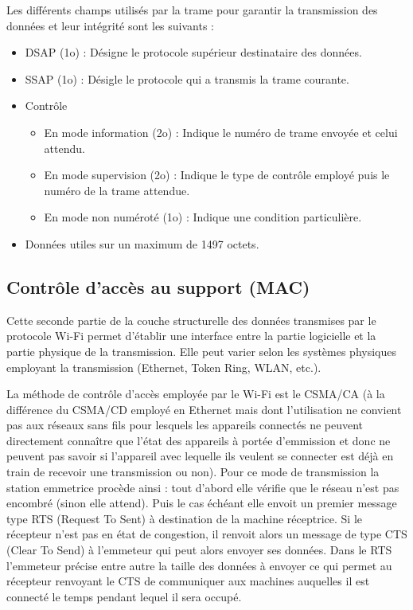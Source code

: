 \documentclass[12pt]{article}
\begin{document}
Les différents champs utilisés par la trame pour garantir la transmission des données et leur intégrité sont les suivants :

\begin{itemize}
	\item DSAP (1o) : Désigne le protocole supérieur destinataire des données.
	\item SSAP (1o) : Désigle le protocole qui a transmis la trame courante.
	\item Contrôle
		\begin{itemize}
			\item En mode information (2o) : Indique le numéro de trame envoyée et celui attendu.
			\item En mode supervision (2o) : Indique le type de contrôle employé puis le numéro de la trame attendue.
			\item En mode non numéroté (1o) : Indique une condition particulière.
		\end{itemize}
	\item Données utiles sur un maximum de 1497 octets.
\end{itemize}

\subsection{Contrôle d'accès au support (MAC)}
Cette seconde partie de la couche structurelle des données transmises par le protocole Wi-Fi permet d'établir une interface entre la partie logicielle et la partie physique de la transmission. Elle peut varier selon les systèmes physiques employant la transmission (Ethernet, Token Ring, WLAN, etc.).

La méthode de contrôle d'accès employée par le Wi-Fi est le CSMA/CA (à la différence du CSMA/CD employé en Ethernet mais dont l'utilisation ne convient pas aux réseaux sans fils pour lesquels les appareils connectés ne peuvent directement connaître que l'état des appareils à portée d'emmission et donc ne peuvent pas savoir si l'appareil avec lequelle ils veulent se connecter est déjà en train de recevoir une transmission ou non).
Pour ce mode de transmission la station emmetrice procède ainsi : tout d'abord elle vérifie que le réseau n'est pas encombré (sinon elle attend). Puis le cas échéant elle envoit un premier message type RTS (Request To Sent) à destination de la machine réceptrice. Si le récepteur n'est pas en état de congestion, il renvoit alors un message de type CTS (Clear To Send) à l'emmeteur qui peut alors envoyer ses données. Dans le RTS l'emmeteur précise entre autre la taille des données à envoyer ce qui permet au récepteur renvoyant le CTS de communiquer aux machines auquelles il est connecté le temps pendant lequel il sera occupé.
\end{document}
